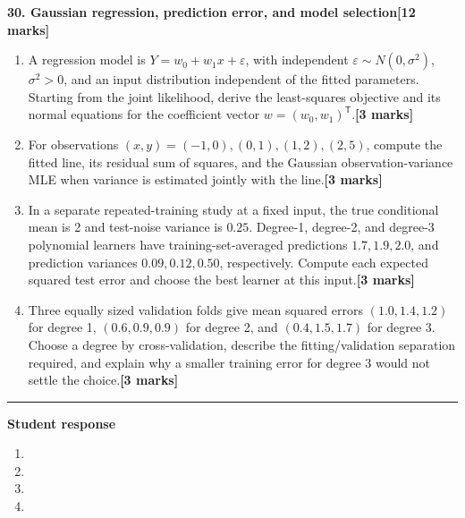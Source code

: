 \documentclass[11pt,a4paper]{article}
\newlength{\BlankAnswerHeight}\setlength{\BlankAnswerHeight}{16mm}
\newcommand{\AnswerBlank}{\leavevmode\par\vspace{\BlankAnswerHeight}}
\begin{document}
\textbf{30. Gaussian regression, prediction error, and model selection}\hfill\textbf{[12 marks]}\par\medskip
\begin{enumerate}[label=(\alph*),leftmargin=8mm,itemsep=3pt]
\item A regression model is \(Y=w_0+w_1x+\varepsilon\), with independent \(\varepsilon\sim N(0,\sigma^2)\), \(\sigma^2>0\), and an input distribution independent of the fitted parameters. Starting from the joint likelihood, derive the least-squares objective and its normal equations for the coefficient vector \(w=(w_0,w_1)^\mathsf T\).\hfill\textbf{[3 marks]}
\item For observations \((x,y)=(-1,0),(0,1),(1,2),(2,5)\), compute the fitted line, its residual sum of squares, and the Gaussian observation-variance MLE when variance is estimated jointly with the line.\hfill\textbf{[3 marks]}
\item In a separate repeated-training study at a fixed input, the true conditional mean is 2 and test-noise variance is \(0.25\). Degree-1, degree-2, and degree-3 polynomial learners have training-set-averaged predictions \(1.7,1.9,2.0\), and prediction variances \(0.09,0.12,0.50\), respectively. Compute each expected squared test error and choose the best learner at this input.\hfill\textbf{[3 marks]}
\item Three equally sized validation folds give mean squared errors \((1.0,1.4,1.2)\) for degree 1, \((0.6,0.9,0.9)\) for degree 2, and \((0.4,1.5,1.7)\) for degree 3. Choose a degree by cross-validation, describe the fitting/validation separation required, and explain why a smaller training error for degree 3 would not settle the choice.\hfill\textbf{[3 marks]}
\end{enumerate}\par\medskip\hrule\medskip\textbf{Student response}\par
\begin{enumerate}[label=(\alph*),leftmargin=8mm,itemsep=3pt]
\item
\AnswerBlank
\item
\AnswerBlank
\item
\AnswerBlank
\item
\AnswerBlank
\end{enumerate}
\end{document}
